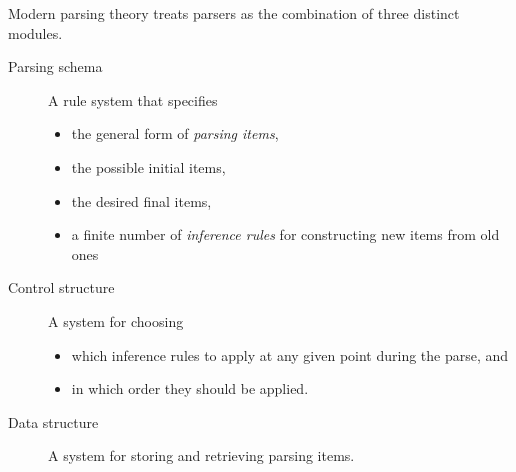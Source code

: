 Modern parsing theory treats parsers as the combination of three distinct modules.
%
\begin{description}
    \item[Parsing schema]
        A rule system that specifies
        \begin{itemize}
            \item the general form of \emph{parsing items},
            \item the possible initial items,
            \item the desired final items,
            \item a finite number of \emph{inference rules} for constructing new items from old ones
        \end{itemize}
    \item[Control structure]
        A system for choosing
        \begin{itemize}
            \item which inference rules to apply at any given point during the parse, and
            \item in which order they should be applied.
        \end{itemize}
    \item[Data structure]
        A system for storing and retrieving parsing items.
\end{description}
%
